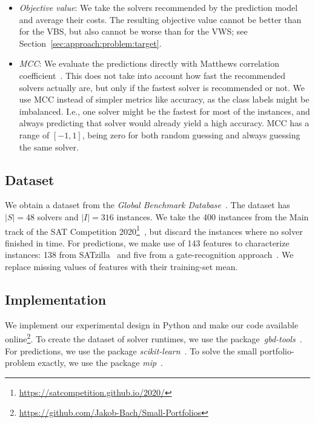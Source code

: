 \documentclass[conference]{IEEEtran}
\begin{document}
\begin{itemize}
	\item \emph{Objective value}:
	We take the solvers recommended by the prediction model and average their costs.
	The resulting objective value cannot be better than for the VBS, but also cannot be worse than for the VWS; see Section~\ref{sec:approach:problem:target}.
	\item \emph{MCC}:
	We evaluate the predictions directly with Matthews correlation coefficient~\cite{matthews1975comparison, gorodkin2004comparing}.
	This does not take into account how fast the recommended solvers actually are, but only if the fastest solver is recommended or not.
	We use MCC instead of simpler metrics like accuracy, as the class labels might be imbalanced.
	I.e., one solver might be the fastest for most of the instances, and always predicting that solver would already yield a high accuracy.
	MCC has a range of $[-1,1]$, being zero for both random guessing and always guessing the same solver.
\end{itemize}

\subsection{Dataset}

We obtain a dataset from the \emph{Global Benchmark Database}~\cite{iser2020collaborative}.
The dataset has $|S| = 48$ solvers and $|I| = 316$ instances.
We take the 400 instances from the Main track of the SAT Competition 2020\footnote{\url{https://satcompetition.github.io/2020/}}~\cite{balyo2020proceedings, SC2020:AIJ}, but discard the instances where no solver finished in time.
For predictions, we make use of 143 features to characterize instances:
138 from SATzilla~\cite{xu2008satzilla, xu2012satzilla2012} and five from a gate-recognition approach~\cite{iser2020recognition}.
We replace missing values of features with their training-set mean.

\subsection{Implementation}

We implement our experimental design in Python and make our code available online\footnote{\url{https://github.com/Jakob-Bach/Small-Portfolios}}.
To create the dataset of solver runtimes, we use the package~\emph{gbd-tools}~\cite{iser2020collaborative}.
For predictions, we use the package \emph{scikit-learn}~\cite{scikit-learn}.
To solve the small portfolio-problem exactly, we use the package \emph{mip}~\cite{python-mip}.
\end{document}
